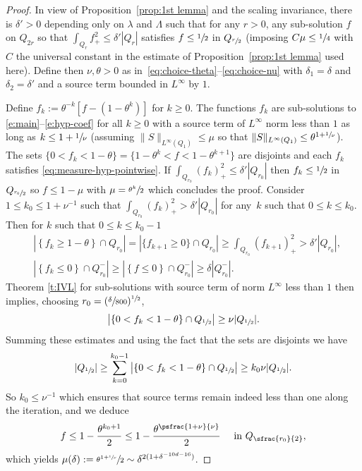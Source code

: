 \begin{proof}
In view of Proposition~\ref{prop:1st lemma} and the scaling
invariance, there is $\delta'>0$ depending only on $\lambda$
and $\Lambda$ such that for any $r>0$, any sub-solution $f$ on
$Q_{2r}$ so that $\int_{Q_{r}} f_{+}^2 \leq \delta' |Q_{r}|$
satisfies $f\leq \sfrac{1}{2}$ in $Q_{\sfrac{r}{2}}$ (imposing
$C\mu\le \sfrac{1}{4}$ with $C$ the universal constant in the
estimate of Proposition~\ref{prop:1st lemma} used here). Define
then $\nu, \theta>0$ as
in~\eqref{eq:choice-theta}--\eqref{eq:choice-nu} with
$\delta_1=\delta$ and $\delta_2=\delta'$ and a source term
bounded in $L^\infty$ by $1$.

Define $f_k := \theta^{-k}[f-(1-\theta^k)]$ for $k \ge 0$. The
functions $f_{k}$ are sub-solutions to
\eqref{e:main}--\eqref{e:hyp-coef} for all $k \ge 0$ with a
source term of $L^{\infty}$ norm less than $1$ as long as
$k\leq 1+\sfrac{1}{\nu}$ (assuming
$\| S\|_{L^{\infty}(Q_1)}\le \mu$ so that
$\| S\|_{L^{\infty}(Q_1)} \le \theta^{1+\sfrac{1}{\nu}}$). The
sets $\{ 0<f_{k}<1-\theta\}= \{1-\theta^k<f<1-\theta^{k+1}\}$
are disjoints and each $f_k$ satisfies
\eqref{eq:measure-hyp-pointwise}. If
$\int_{Q_{r_0}} (f_k)_{+}^2 \leq \delta' |Q_{r_0}|$ then
$f_k\leq \sfrac{1}{2}$ in $Q_{\sfrac{r_0}{2}}$ so $f\le 1-\mu$
with $\mu = \sfrac{\theta^k}{2}$ which concludes the proof.
Consider $ 1\leq k_0 \leq 1+\nu^{-1}$ such that
$\int_{Q_{r_0}} (f_{k})_{+}^2 > \delta'|Q_{r_0}|$ for any~$k$ such that $0\leq k\leq k_0$. Then for $k$ such that $0\leq k\leq k_0-1$
\begin{align*}
& \left|\left\{ f_{k}\geq 1-\theta \right\} \cap
Q_{r_0}\right| = \left|\{f_{k+1}\geq
0\} \cap Q_{r_0} \right| \geq \int_{Q_{r_0} } (f_{k+1})_{+}^2
> \delta' |Q_{r_0}|, \\
& \left|\left\{f_{k}\leq 0\right\} \cap Q_{r_0}^{-}\right|
\geq \left|\left\{f\leq 0 \right\}\cap Q_{r_0}^{-}\right|
\geq \delta |Q_{r_0}^-|.
\end{align*}
Theorem \ref{t:IVL} for sub-solutions with source term of norm
$L^{\infty}$ less than $1$ then implies, choosing $r_0 =
(\sfrac{\delta}{800})^{\sfrac12}$,
\[
\left| \left\{ 0<f_{k}< 1-\theta \right\}\cap Q_{\sfrac12}\right|
\geq \nu |Q_{\sfrac12}|.
\]
Summing these estimates and using the fact that the sets are
disjoints we have
\[
|Q_{\sfrac12}|\geq \sum_{k=0}^{k_0-1}
\left| \left\{ 0<f_{k}< 1-\theta \right\}\cap
Q_{\sfrac12} \right| \geq k_0 \nu |Q_{\sfrac12}|.
\]
So $k_0 \leq \nu^{-1}$ which ensures that source terms remain
indeed less than one along the iteration, and we deduce
\begin{align*}
f \leq 1-\frac{\theta^{k_0+1}}{2}\leq
1-\frac{\theta^{\psfrac{1+\nu}{\nu}}}{2} \quad \mbox{ in }
Q_{\sfrac{r_0}{2}},
\end{align*}
which yields
$\mu(\delta) := \sfrac{\theta^{1+\sfrac{1}{\nu}}}{2} \sim
\delta^{2 (1+\delta^{-10d-16})}$.
\end{proof}

